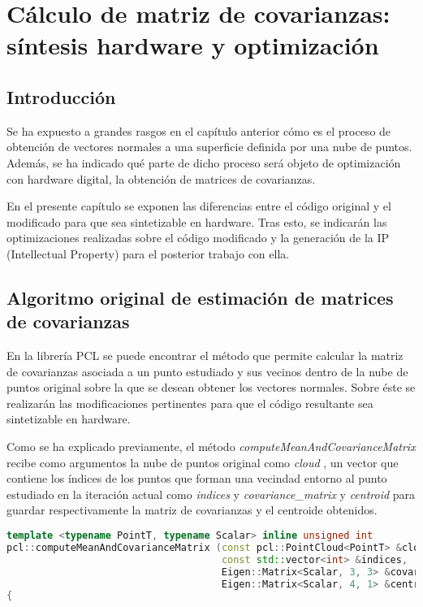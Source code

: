 \chapter{Cálculo de matriz de covarianzas: síntesis hardware y optimización}

\section{Introducción}
Se ha expuesto a grandes rasgos en el capítulo anterior cómo es el proceso de obtención de vectores normales a una superficie definida por una nube de puntos. Además, se ha indicado qué parte de dicho proceso será objeto de optimización con hardware digital, la obtención de matrices de covarianzas.

En el presente capítulo se exponen las diferencias entre el código original y el modificado para que sea sintetizable en hardware. Tras esto, se indicarán las optimizaciones realizadas sobre el código modificado y la generación de la IP (Intellectual Property) para el posterior trabajo con ella.




\section{Algoritmo original de estimación de matrices de covarianzas}

En la librería PCL se puede encontrar el método que permite calcular la matriz de covarianzas asociada a un punto estudiado y sus vecinos dentro de la nube de puntos original sobre la que se desean obtener los vectores normales. Sobre éste se realizarán las modificaciones pertinentes para que el código resultante sea sintetizable en hardware.

Como se ha explicado previamente, el método \textit{computeMeanAndCovarianceMatrix} recibe como argumentos la nube de puntos original como \textit{cloud} , un vector que contiene los índices de los puntos que forman una vecindad entorno al punto estudiado en la iteración actual como \textit{indices} y \textit{covariance\_matrix} y \textit{centroid} para guardar respectivamente la matriz de covarianzas y el centroide obtenidos.

\begin{lstlisting}[language=C++,breaklines]
  template <typename PointT, typename Scalar> inline unsigned int
pcl::computeMeanAndCovarianceMatrix (const pcl::PointCloud<PointT> &cloud,
                                     const std::vector<int> &indices,
                                     Eigen::Matrix<Scalar, 3, 3> &covariance_matrix,
                                     Eigen::Matrix<Scalar, 4, 1> &centroid)
{
\end{lstlisting}

